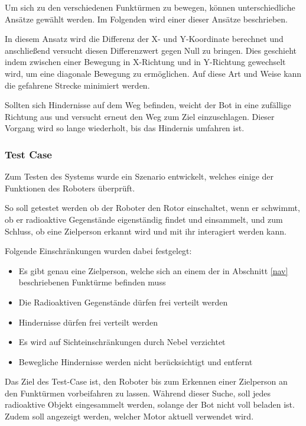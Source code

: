 Um sich zu den verschiedenen Funktürmen zu bewegen, können unterschiedliche Ansätze gewählt werden. Im Folgenden wird einer dieser Ansätze beschrieben.

In diesem Ansatz wird die Differenz der X- und Y-Koordinate berechnet und anschließend versucht diesen Differenzwert gegen Null zu bringen. Dies geschieht indem zwischen einer Bewegung in X-Richtung und in Y-Richtung gewechselt wird, um eine diagonale Bewegung zu ermöglichen. Auf diese Art und Weise kann die gefahrene Strecke minimiert werden. 

Sollten sich Hindernisse auf dem Weg befinden, weicht der Bot in eine zufällige Richtung aus und versucht erneut den Weg zum Ziel einzuschlagen. Dieser Vorgang wird so lange wiederholt, bis das Hindernis umfahren ist.  

\subsubsection{Test Case}
\label{test}
Zum Testen des Systems wurde ein Szenario entwickelt, welches einige der Funktionen des Roboters überprüft. 

So soll getestet werden ob der Roboter den Rotor einschaltet, wenn er schwimmt, ob er radioaktive Gegenstände eigenständig findet und einsammelt, und zum Schluss, ob eine Zielperson erkannt wird und mit ihr interagiert werden kann. 

Folgende Einschränkungen wurden dabei festgelegt: 

\begin{itemize}
	\item Es gibt genau eine Zielperson, welche sich an einem der in Abschnitt \ref{nav} beschriebenen Funktürme befinden muss
	\item Die Radioaktiven Gegenstände dürfen frei verteilt werden
	\item Hindernisse dürfen frei verteilt werden
	\item Es wird auf Sichteinschränkungen durch Nebel verzichtet
	\item Bewegliche Hindernisse werden nicht berücksichtigt und entfernt
\end{itemize}
 
Das Ziel des Test-Case ist, den Roboter bis zum Erkennen einer Zielperson an den Funktürmen vorbeifahren zu lassen. Während dieser Suche, soll jedes radioaktive Objekt eingesammelt werden, solange der Bot nicht voll beladen ist. Zudem soll angezeigt werden, welcher Motor aktuell verwendet wird.

